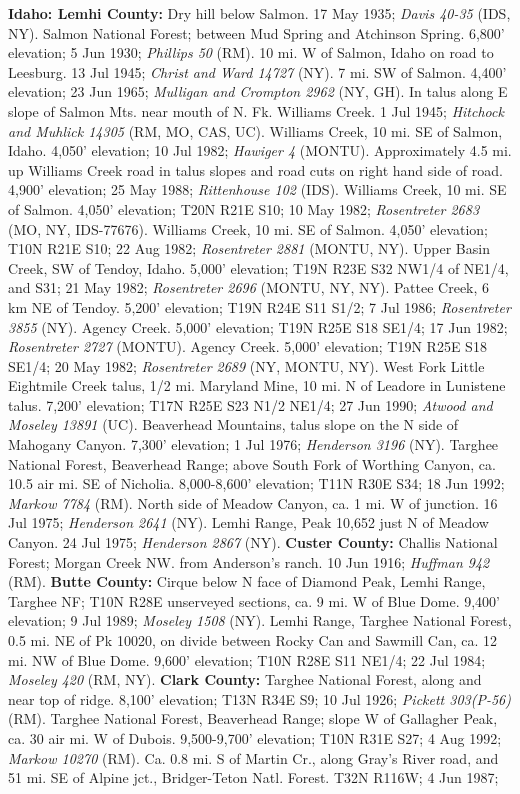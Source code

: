 \textbf{Idaho: Lemhi County:} Dry hill below Salmon. 17 May 1935; \textit{Davis 40-35} (IDS, NY).  Salmon National Forest; between Mud Spring and Atchinson Spring. 6,800' elevation; 5 Jun 1930; \textit{Phillips 50} (RM).  10 mi. W of Salmon, Idaho on road to Leesburg. 13 Jul 1945; \textit{Christ and Ward 14727} (NY).  7 mi. SW of Salmon.  4,400' elevation; 23 Jun 1965; \textit{Mulligan and Crompton 2962} (NY, GH).  In talus along E slope of Salmon Mts. near mouth of N. Fk. Williams Creek. 1 Jul 1945; \textit{Hitchock and Muhlick 14305} (RM, MO, CAS, UC).  Williams Creek, 10 mi. SE of Salmon, Idaho. 4,050' elevation; 10 Jul 1982; \textit{Hawiger 4} (MONTU).  Approximately 4.5 mi. up Williams Creek road in talus slopes and road cuts on right hand side of road. 4,900' elevation; 25 May 1988; \textit{Rittenhouse 102} (IDS).  Williams Creek, 10 mi. SE of Salmon. 4,050' elevation; T20N R21E S10; 10 May 1982; \textit{Rosentreter 2683} (MO, NY, IDS-77676).  Williams Creek, 10 mi. SE of Salmon. 4,050' elevation; T10N R21E S10; 22 Aug 1982; \textit{Rosentreter 2881} (MONTU, NY).  Upper Basin Creek, SW of Tendoy, Idaho. 5,000' elevation; T19N R23E S32 NW1/4 of NE1/4, and S31; 21 May 1982; \textit{Rosentreter 2696} (MONTU, NY, NY).  Pattee Creek, 6 km NE of Tendoy. 5,200' elevation; T19N R24E S11 S1/2; 7 Jul 1986; \textit{Rosentreter 3855} (NY).  Agency Creek. 5,000' elevation; T19N R25E S18 SE1/4; 17 Jun 1982; \textit{Rosentreter 2727} (MONTU).  Agency Creek. 5,000' elevation; T19N R25E S18  SE1/4; 20 May 1982; \textit{Rosentreter 2689} (NY, MONTU, NY).  West Fork Little Eightmile Creek talus, 1/2 mi. Maryland Mine, 10 mi. N of Leadore in Lunistene talus. 7,200' elevation; T17N R25E S23 N1/2 NE1/4; 27 Jun 1990; \textit{Atwood and Moseley 13891} (UC).  Beaverhead Mountains, talus slope on the N side of Mahogany Canyon. 7,300' elevation; 1 Jul 1976; \textit{Henderson 3196} (NY).  Targhee National Forest, Beaverhead Range; above South Fork of Worthing Canyon, ca. 10.5 air mi. SE of Nicholia. 8,000-8,600' elevation; T11N R30E S34; 18 Jun 1992; \textit{Markow 7784} (RM).  North side of Meadow Canyon, ca. 1 mi. W of junction. 16 Jul 1975; \textit{Henderson 2641} (NY).  Lemhi Range, Peak 10,652 just N of Meadow Canyon. 24 Jul 1975; \textit{Henderson 2867} (NY).  \textbf{Custer County:} Challis National Forest; Morgan Creek NW. from Anderson's ranch. 10 Jun 1916; \textit{Huffman 942} (RM).  \textbf{Butte County:} Cirque below N face of Diamond Peak, Lemhi Range, Targhee NF; T10N R28E unserveyed sections, ca. 9 mi. W of Blue Dome. 9,400' elevation; 9 Jul 1989; \textit{Moseley 1508} (NY).  Lemhi Range, Targhee National Forest, 0.5 mi. NE of Pk 10020, on divide between Rocky Can and Sawmill Can, ca. 12 mi. NW of Blue Dome. 9,600' elevation; T10N R28E S11 NE1/4; 22 Jul 1984; \textit{Moseley 420} (RM, NY).  \textbf{Clark County:} Targhee National Forest, along and near top of ridge. 8,100' elevation; T13N R34E S9; 10 Jul 1926; \textit{Pickett 303(P-56)} (RM).  Targhee National Forest, Beaverhead Range; slope W of Gallagher Peak, ca. 30 air mi. W of Dubois. 9,500-9,700' elevation; T10N R31E S27; 4 Aug 1992; \textit{Markow 10270} (RM).  Ca. 0.8 mi. S of Martin Cr., along Gray's River road, and 51 mi. SE of Alpine jct., Bridger-Teton Natl. Forest. T32N R116W; 4 Jun 1987; 